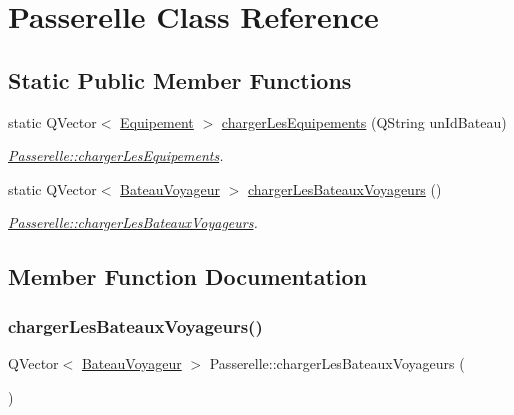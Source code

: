 \hypertarget{class_passerelle}{}\section{Passerelle Class Reference}
\label{class_passerelle}
\subsection*{Static Public Member Functions}
\begin{DoxyCompactItemize}
\item 
static Q\+Vector$<$ \hyperlink{class_equipement}{Equipement} $>$ \hyperlink{class_passerelle_a612df1d1532ab6a58efe8c0af66858a4}{charger\+Les\+Equipements} (Q\+String un\+Id\+Bateau)
\begin{DoxyCompactList}\small\item\em \hyperlink{class_passerelle_a612df1d1532ab6a58efe8c0af66858a4}{Passerelle\+::charger\+Les\+Equipements}. \end{DoxyCompactList}\item 
static Q\+Vector$<$ \hyperlink{class_bateau_voyageur}{Bateau\+Voyageur} $>$ \hyperlink{class_passerelle_a9f8cdd9d52d668bb33a5380324fb9c51}{charger\+Les\+Bateaux\+Voyageurs} ()
\begin{DoxyCompactList}\small\item\em \hyperlink{class_passerelle_a9f8cdd9d52d668bb33a5380324fb9c51}{Passerelle\+::charger\+Les\+Bateaux\+Voyageurs}. \end{DoxyCompactList}\end{DoxyCompactItemize}


\subsection{Member Function Documentation}
\mbox{\label{class_passerelle_a9f8cdd9d52d668bb33a5380324fb9c51}} 
\subsubsection{\texorpdfstring{charger\+Les\+Bateaux\+Voyageurs()}{chargerLesBateauxVoyageurs()}}
{\footnotesize\ttfamily Q\+Vector$<$ \hyperlink{class_bateau_voyageur}{Bateau\+Voyageur} $>$ Passerelle\+::charger\+Les\+Bateaux\+Voyageurs (\begin{DoxyParamCaption}{ }\end{DoxyParamCaption})\hspace{0.3cm}{\ttfamily [static]}}



